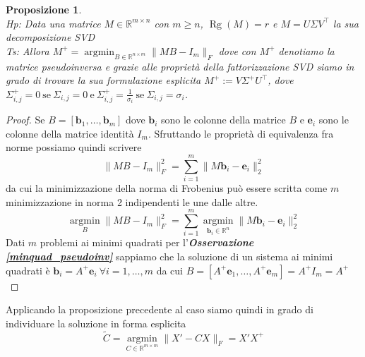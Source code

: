 \documentclass[11pt]{article}
\newtheorem{proposition}{Proposizione}
\newcommand{\R}{\mathbb{R}}
\begin{document}
\begin{proposition}\label{Minim}
\textbf{}\\
\textit{Hp:} Data una matrice \( M \in \R^{m \times n} \) con \( m \geq n \), \(\operatorname*{Rg}(M) = r\) e \(M= U\Sigma V^\top \) la sua decomposizione SVD \\
\textit{Ts:} Allora \(M^+={\operatorname*{argmin}}_{B \in \R^{n \times m}}{\|MB - I_m\|_F }\) dove con \(M^+\) denotiamo la matrice pseudoinversa e grazie alle proprietà della fattorizzazione SVD siamo in grado di trovare la sua formulazione esplicita \( M^+:=V\Sigma^+U^\top \), dove \( \Sigma_{i,j}^+=0 \ \text{se} \ \Sigma_{i,j}=0 \ \text{e} \ \Sigma_{i,j}^+= \frac{1}{\sigma_i} \ \text{se} \  \Sigma_{i,j}=\sigma_i \).
\end{proposition}
\begin{proof}
Se \(B=[ \mathbf{b}_1, \dots, \mathbf{b}_m]\) dove \( \mathbf{b}_i  \) sono le colonne della matrice  \(B\) e \( \mathbf{e}_i \) sono le colonne della matrice identità \( I_m \). 
Sfruttando le proprietà di equivalenza fra norme possiamo quindi scrivere 
\[ \|MB - I_m \|_F^2= \sum_{i=1}^m \|M\mathbf{b}_i - \mathbf{e}_i \|_2^2 \]
da cui la minimizzazione della norma di Frobenius può essere scritta come \(m\) minimizzazione in norma 2 indipendenti le une dalle altre. 
\[
\operatorname*{argmin}_B \|MB - I_m \|_F^2 = \sum_{i=1}^m \operatorname*{argmin}_{\mathbf{b}_i \in \R^n} \|M \mathbf{b}_i - \mathbf{e}_i \|_2^2
\]
Dati \(m\) problemi ai minimi quadrati per l'\textit{\textbf{Osservazione \ref{minquad_pseudoinv}}} sappiamo che la soluzione di un sistema ai minimi quadrati è \( \mathbf{b}_i= A^+\mathbf{e}_i \ \forall i=1, \dots, m\) da cui \(B=[A^+ \mathbf{e}_1, \dots, A^+\mathbf{e}_m ]=A^+ I_m=A^+ \)
\end{proof} 
Applicando la proposizione precedente al caso siamo quindi in grado di individuare la soluzione in forma esplicita $$ \tilde{C} = \operatorname*{argmin}_{C \in \R^{m \times m}}{\|X' -C X\|_F =X'X^+} $$
\end{document}
